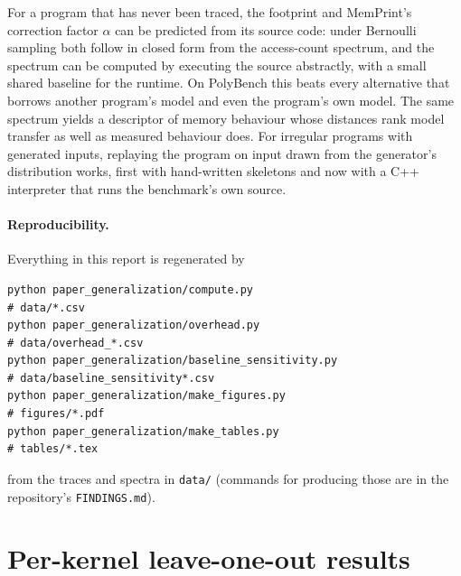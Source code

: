 \documentclass[11pt]{article}
\newcommand{\fittable}[1]{\sbox{\fitbox}{}%
  \ifdim\wd\fitbox>\linewidth\resizebox{\linewidth}{!}{\usebox{\fitbox}}\else\usebox{\fitbox}\fi}
\newcommand{\memprint}{MemPrint}
\newcommand{\code}[1]{\texttt{#1}}
\newcommand{\zhat}{\hat z}
\begin{document}
For a program that has never been traced, the footprint and \memprint{}'s correction factor $\alpha$ can be
predicted from its source code: under Bernoulli sampling both follow in closed form from the access-count spectrum,
and the spectrum can be computed by executing the source abstractly, with a small shared baseline for the runtime.
On PolyBench this beats every alternative that borrows another program's model and even the program's own model.
The same spectrum yields a descriptor of memory behaviour whose distances rank model transfer as well as measured
behaviour does. For irregular programs with generated inputs, replaying the program on input drawn from the
generator's distribution works, first with hand-written skeletons and now with a C++ interpreter that runs the
benchmark's own source.

\paragraph{Reproducibility.}
Everything in this report is regenerated by
\begin{lstlisting}
python paper_generalization/compute.py                                # data/*.csv
python paper_generalization/overhead.py                               # data/overhead_*.csv
python paper_generalization/baseline_sensitivity.py                   # data/baseline_sensitivity*.csv
python paper_generalization/make_figures.py                           # figures/*.pdf
python paper_generalization/make_tables.py                            # tables/*.tex
\end{lstlisting}
from the traces and spectra in \code{data/} (commands for producing those are in the repository's
\code{FINDINGS.md}).

\clearpage



\appendix
\section{Per-kernel leave-one-out results}

\begin{table}[!htbp]
\centering\scriptsize
\caption[Per-kernel leave-one-out results]{Per held-out PolyBench kernel: footprint error (fp), static $\alpha$ and own
model MAPE (\%) for both splits, and, for EXTRA, the known kernel nearest by $\zhat$ and the oracle.}
\label{tab:lowo-kernel}
\fittable{tables/lowo_per_kernel.tex}
\end{table}
\end{document}
